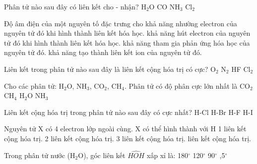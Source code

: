 \begin{ex}
Phân tử nào sau đây có liên kết cho - nhận?
\choice
{H$_2$O}
{\True CO}
{NH$_3$}
{Cl$_2$}
\end{ex}

\begin{ex}
Độ âm điện của một nguyên tố đặc trưng cho
\choice
{khả năng nhường electron của nguyên tử đó khi hình thành liên kết hóa học.}
{\True khả năng hút electron của nguyên tử đó khi hình thành liên kết hóa học.}
{khả năng tham gia phản ứng hóa học của nguyên tử đó.}
{khả năng tạo thành liên kết ion của nguyên tử đó.}
\end{ex}

\begin{ex}
Liên kết trong phân tử nào sau đây là liên kết cộng hóa trị có cực?
\choice
{O$_2$}
{N$_2$}
{\True HF}
{Cl$_2$}
\end{ex}

\begin{ex}
Cho các phân tử: H$_2$O, NH$_3$, CO$_2$, CH$_4$. Phân tử có độ phân cực lớn nhất là
\choice
{CO$_2$}
{CH$_4$}
{\True H$_2$O}
{NH$_3$}
\end{ex}

\begin{ex}
Liên kết cộng hóa trị trong phân tử nào sau đây có cực nhất?
\choice
{H-Cl}
{H-Br}
{\True H-F}
{H-I}
\end{ex}

\begin{ex}
Nguyên tử X có 4 electron lớp ngoài cùng. X có thể hình thành với H
\choice
{1 liên kết cộng hóa trị.}
{2 liên kết cộng hóa trị.}
{3 liên kết cộng hóa trị.}
{ liên kết cộng hóa trị.}
\end{ex}
\begin{ex}
Trong phân tử nước (H$_2$O), góc liên kết  $\widehat{HOH}$ xấp xỉ là:
\choice
{180$^\circ$}
{120$^\circ$}
{90$^\circ$}
{,5$^\circ$}
\end{ex}

